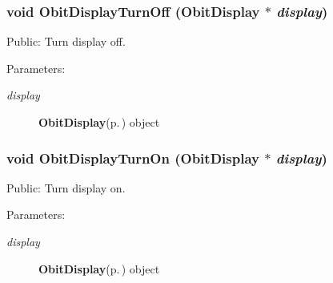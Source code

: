 \subsubsection{\setlength{\rightskip}{0pt plus 5cm}void Obit\-Display\-Turn\-Off ({\bf Obit\-Display} $\ast$ {\em display})}\label{ObitDisplay_8h_a19}


Public: Turn display off. 

\begin{Desc}
\item[Parameters:]
\begin{description}
\item[{\em display}]{\bf Obit\-Display}{\rm (p.\,\pageref{structObitDisplay})} object \end{description}
\end{Desc}
\subsubsection{\setlength{\rightskip}{0pt plus 5cm}void Obit\-Display\-Turn\-On ({\bf Obit\-Display} $\ast$ {\em display})}\label{ObitDisplay_8h_a18}


Public: Turn display on. 

\begin{Desc}
\item[Parameters:]
\begin{description}
\item[{\em display}]{\bf Obit\-Display}{\rm (p.\,\pageref{structObitDisplay})} object \end{description}
\end{Desc}
